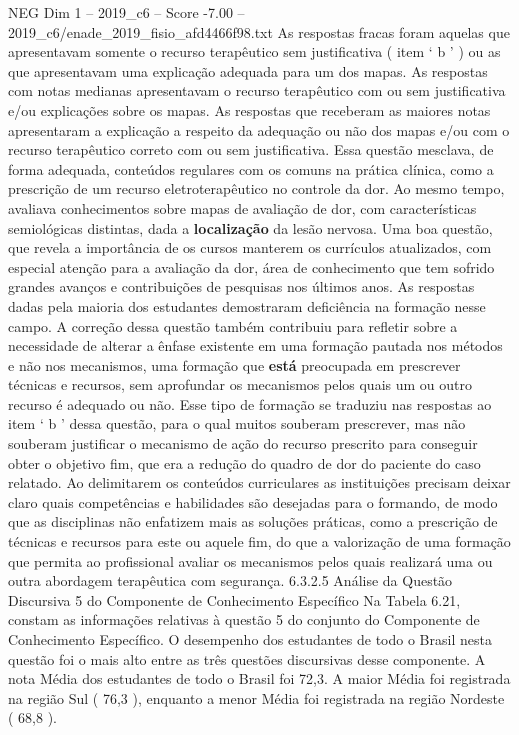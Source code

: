\begin{textsample}{NEG Dim 1 – 2019\_c6 – Score -7.00 – 2019\_c6/enade\_2019\_fisio\_afd4466f98.txt}
As respostas fracas foram aquelas que apresentavam somente o recurso terapêutico sem justificativa ( item ‘ b ’ ) ou as que apresentavam uma explicação adequada para um dos mapas.
As respostas com notas medianas apresentavam o recurso terapêutico com ou sem justificativa e/ou explicações sobre os mapas.
As respostas que receberam as maiores notas apresentaram a explicação a respeito da adequação ou não dos mapas e/ou com o recurso terapêutico correto com ou sem justificativa.
Essa questão mesclava, de forma adequada, conteúdos regulares com os comuns na prática clínica, como a prescrição de um recurso eletroterapêutico no controle da dor.
Ao mesmo tempo, avaliava conhecimentos sobre mapas de avaliação de dor, com características semiológicas distintas, dada a \textbf{localização} da lesão nervosa.
Uma boa questão, que revela a importância de os cursos manterem os currículos atualizados, com especial atenção para a avaliação da dor, área de conhecimento que tem sofrido grandes avanços e contribuições de pesquisas nos últimos anos.
As respostas dadas pela maioria dos estudantes demostraram deficiência na formação nesse campo.
A correção dessa questão também contribuiu para refletir sobre a necessidade de alterar a ênfase existente em uma formação pautada nos métodos e não nos mecanismos, uma formação que \textbf{está} preocupada em prescrever técnicas e recursos, sem aprofundar os mecanismos pelos quais um ou outro recurso é adequado ou não.
Esse tipo de formação se traduziu nas respostas ao item ‘ b ’ dessa questão, para o qual muitos souberam prescrever, mas não souberam justificar o mecanismo de ação do recurso prescrito para conseguir obter o objetivo fim, que era a redução do quadro de dor do paciente do caso relatado.
Ao delimitarem os conteúdos curriculares as instituições precisam deixar claro quais competências e habilidades são desejadas para o formando, de modo que as disciplinas não enfatizem mais as soluções práticas, como a prescrição de técnicas e recursos para este ou aquele fim, do que a valorização de uma formação que permita ao profissional avaliar os mecanismos pelos quais realizará uma ou outra abordagem terapêutica com segurança. 6.3.2.5 Análise da Questão Discursiva 5 do Componente de Conhecimento Específico Na Tabela 6.21, constam as informações relativas à questão 5 do conjunto do Componente de Conhecimento Específico.
O desempenho dos estudantes de todo o Brasil nesta questão foi o mais alto entre as três questões discursivas desse componente.
A nota Média dos estudantes de todo o Brasil foi 72,3.
A maior Média foi registrada na região Sul ( 76,3 ), enquanto a menor Média foi registrada na região Nordeste ( 68,8 ).

\end{textsample}
